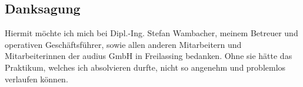 \subsection*{Danksagung}

Hiermit möchte ich mich bei Dipl.-Ing. Stefan Wambacher, meinem Betreuer und operativen Geschäftsführer, sowie allen anderen Mitarbeitern und Mitarbeiterinnen der audius GmbH in Freilassing bedanken. Ohne sie hätte das Praktikum, welches ich absolvieren durfte, nicht so angenehm und problemlos verlaufen können.
